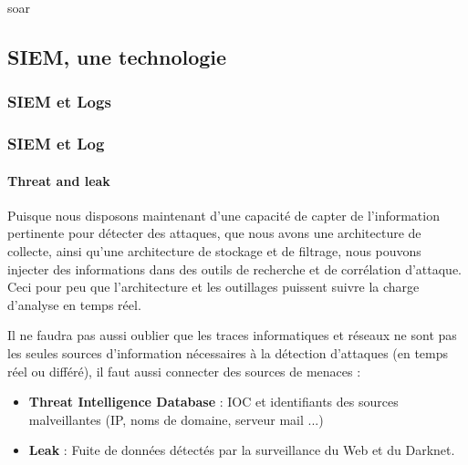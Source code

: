 soar%


\subsection{SIEM, une technologie}

\subsubsection{SIEM et Logs}

\begin{frame}
\frametitle<presentation>{SIEM et Log}
\framesubtitle<presentation>{Threat and leak}
Puisque nous disposons maintenant d'une capacité de capter de l'information pertinente pour détecter des attaques, que nous avons une architecture de collecte,  ainsi qu'une architecture de stockage et de filtrage, nous pouvons injecter des informations dans des outils de recherche et de corrélation d'attaque.
Ceci pour peu que l'architecture et les outillages puissent suivre la charge d'analyse en temps réel.

Il ne faudra pas aussi oublier que les traces informatiques et réseaux ne sont pas les seules sources d'information nécessaires à la détection d'attaques (en temps réel ou différé), il faut aussi connecter des sources de menaces : 
\begin{itemize}
  \item \textbf{Threat Intelligence Database }:  IOC et identifiants des sources malveillantes (IP, noms de domaine, serveur mail ...)
  \item  \textbf{Leak} : Fuite de données détectés par la surveillance du Web et du Darknet.
\end{itemize}

\end{frame}


